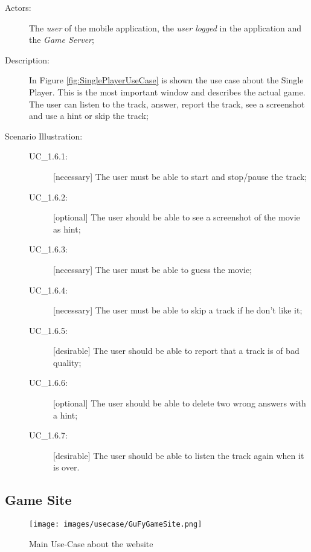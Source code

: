 \begin{description}
	\item[Actors:] The \textit{user} of the mobile application, the \textit{user logged} in the application and the \textit{Game Server};
	\item[Description:] In Figure \ref{fig:SinglePlayerUseCase} is shown the use case about the Single Player. This is the most important window and describes the actual game. The user can listen to the track, answer, report the track, see a screenshot and use a hint or skip the track;
	\item[Scenario Illustration:]
	
		\begin{description}
			\item[UC\_1.6.1:] [necessary] The user must be able to start and stop/pause the track;
			\item[UC\_1.6.2:] [optional] The user should be able to see a screenshot of the movie as hint;
			\item[UC\_1.6.3:] [necessary] The user must be able to guess the movie;
			\item[UC\_1.6.4:] [necessary] The user must be able to skip a track if he don't like it;
			\item[UC\_1.6.5:] [desirable] The user should be able to report that a track is of bad quality;
			\item[UC\_1.6.6:] [optional]  The user should be able to delete two wrong answers with a hint;
			\item[UC\_1.6.7:] [desirable] The user should be able to listen the track again when it is over.
		\end{description}
	
\end{description}


\subsection{Game Site}
\label{sec:gameSite}
\begin{figure}[H]
\centering %
\texttt{[image: images/usecase/GuFyGameSite.png]}
\caption{Main Use-Case about the website}
\label{fig:GuFyGameSite}
\end{figure}

